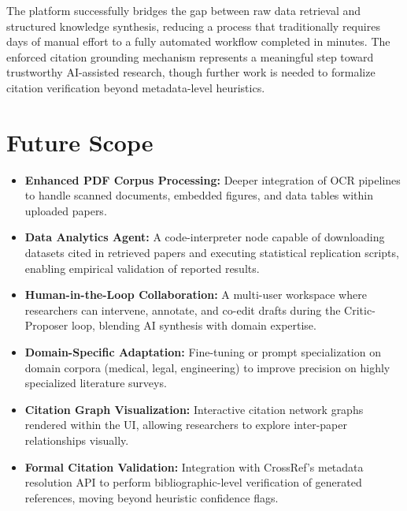 \documentclass[12pt, a4paper]{article}
\begin{document}
The platform successfully bridges the gap between raw data retrieval and structured knowledge
synthesis, reducing a process that traditionally requires days of manual effort to a fully
automated workflow completed in minutes. The enforced citation grounding mechanism represents
a meaningful step toward trustworthy AI-assisted research, though further work is needed to
formalize citation verification beyond metadata-level heuristics.

\section{Future Scope}

\begin{itemize}[leftmargin=*, itemsep=5pt]
    \item \textbf{Enhanced PDF Corpus Processing:} Deeper integration of OCR pipelines to
          handle scanned documents, embedded figures, and data tables within uploaded papers.

    \item \textbf{Data Analytics Agent:} A code-interpreter node capable of downloading
          datasets cited in retrieved papers and executing statistical replication scripts,
          enabling empirical validation of reported results.

    \item \textbf{Human-in-the-Loop Collaboration:} A multi-user workspace where researchers
          can intervene, annotate, and co-edit drafts during the Critic-Proposer loop,
          blending AI synthesis with domain expertise.

    \item \textbf{Domain-Specific Adaptation:} Fine-tuning or prompt specialization on
          domain corpora (medical, legal, engineering) to improve precision on highly
          specialized literature surveys.

    \item \textbf{Citation Graph Visualization:} Interactive citation network graphs rendered
          within the UI, allowing researchers to explore inter-paper relationships visually.

    \item \textbf{Formal Citation Validation:} Integration with CrossRef's metadata
          resolution API to perform bibliographic-level verification of generated references,
          moving beyond heuristic confidence flags.
\end{itemize}
\end{document}
